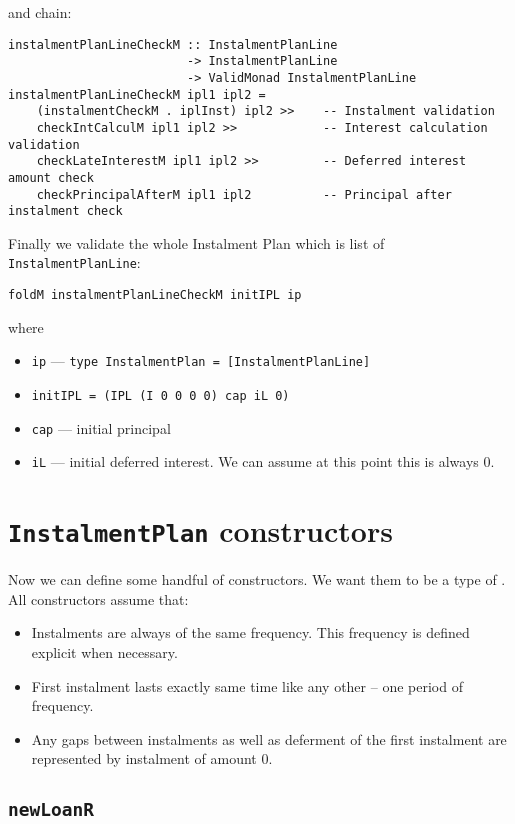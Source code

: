 \documentclass[letterpaper,11pt]{article}
\begin{document}
and chain:

{\small
\begin{verbatim}
instalmentPlanLineCheckM :: InstalmentPlanLine
                         -> InstalmentPlanLine
                         -> ValidMonad InstalmentPlanLine
instalmentPlanLineCheckM ipl1 ipl2 =
    (instalmentCheckM . iplInst) ipl2 >>    -- Instalment validation
    checkIntCalculM ipl1 ipl2 >>            -- Interest calculation validation
    checkLateInterestM ipl1 ipl2 >>         -- Deferred interest amount check
    checkPrincipalAfterM ipl1 ipl2          -- Principal after instalment check
\end{verbatim}
}

Finally we validate the whole Instalment Plan which is list of {\tt InstalmentPlanLine}:

\begin{verbatim}
foldM instalmentPlanLineCheckM initIPL ip
\end{verbatim}

where
\begin{itemize}
\item {\tt ip} --- {\tt type InstalmentPlan = [InstalmentPlanLine]}
\item {\tt initIPL = (IPL (I 0 0 0 0) cap iL 0)}
\item {\tt cap} --- initial principal
\item {\tt iL} --- initial deferred interest. We can assume at this point this is always 0.
\end{itemize}

\section{{\tt InstalmentPlan} constructors}

Now we can define some handful of constructors. We want them to be a type of .
All constructors assume that:
\begin{itemize}
\item Instalments are always of the same frequency. This frequency is defined explicit when necessary.
\item First instalment lasts exactly same time like any other -- one period of frequency.
\item Any gaps between instalments as well as deferment of the first instalment are represented by instalment of amount 0.
\end{itemize}


\subsection{\tt newLoanR}
\end{document}
